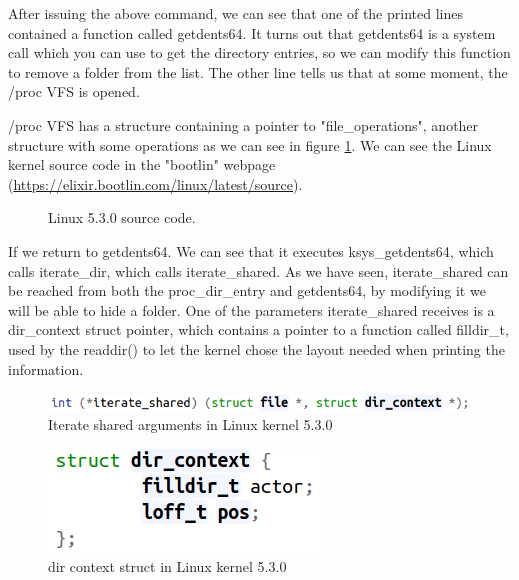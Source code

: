 \documentclass[11pt, a4paper,twoside]{tesi_upf}
\begin{document}
After issuing the above command, we can see that one of the printed lines contained a function called getdents64. It turns out that getdents64 is a system call which you can use to get the directory entries, so we can modify this function to remove a folder from the list. The other line tells us that at some moment, the /proc VFS is opened. 

/proc VFS has a structure containing a pointer to "file\_operations", another structure with some operations as we can see in figure \ref{fig:proc-dir}. We can see the Linux kernel source code in the "bootlin" webpage (\url{https://elixir.bootlin.com/linux/latest/source}).

\begin{figure}
    \centering
    \qquad
    \caption{Linux 5.3.0 source code.}
    \label{fig:proc-dir}
\end{figure}

If we return to getdents64. We can see that it executes ksys\_getdents64, which calls iterate\_dir, which calls iterate\_shared. As we have seen, iterate\_shared can be reached from both the proc\_dir\_entry and getdents64, by modifying it we will be able to hide a folder. One of the parameters iterate\_shared receives is a dir\_context struct pointer, which contains a pointer to a function called filldir\_t, used by the readdir() to let the kernel chose the layout needed when printing the information.

\begin{figure}
    \centering
    \includegraphics[width=\linewidth]{images/iterate-shared-prototype.png}
    \caption{Iterate shared arguments in Linux kernel 5.3.0}
    \label{fig:scheme-hide-folder}
\end{figure}

\begin{figure}
    \centering
    \includegraphics[scale=0.6]{images/dir-context.png}
    \caption{dir context struct in Linux kernel 5.3.0}
    \label{fig:scheme-hide-folder}
\end{figure}
\end{document}

